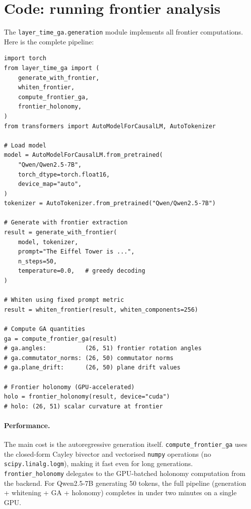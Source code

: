 \documentclass[11pt, twoside, openright]{memoir}
\numberwithin{equation}{chapter}
\begin{document}
\section{Code: running frontier analysis}
\label{sec:frontier-code}

The \texttt{layer\_time\_ga.generation} module implements all
frontier computations.  Here is the complete pipeline:

\begin{lstlisting}[caption={Frontier analysis pipeline}]
import torch
from layer_time_ga import (
    generate_with_frontier,
    whiten_frontier,
    compute_frontier_ga,
    frontier_holonomy,
)
from transformers import AutoModelForCausalLM, AutoTokenizer

# Load model
model = AutoModelForCausalLM.from_pretrained(
    "Qwen/Qwen2.5-7B",
    torch_dtype=torch.float16,
    device_map="auto",
)
tokenizer = AutoTokenizer.from_pretrained("Qwen/Qwen2.5-7B")

# Generate with frontier extraction
result = generate_with_frontier(
    model, tokenizer,
    prompt="The Eiffel Tower is ...",
    n_steps=50,
    temperature=0.0,   # greedy decoding
)

# Whiten using fixed prompt metric
result = whiten_frontier(result, whiten_components=256)

# Compute GA quantities
ga = compute_frontier_ga(result)
# ga.angles:           (26, 51) frontier rotation angles
# ga.commutator_norms: (26, 50) commutator norms
# ga.plane_drift:      (26, 50) plane drift values

# Frontier holonomy (GPU-accelerated)
holo = frontier_holonomy(result, device="cuda")
# holo: (26, 51) scalar curvature at frontier
\end{lstlisting}

\paragraph{Performance.}
The main cost is the autoregressive generation itself.
\texttt{compute\_frontier\_ga} uses the closed-form Cayley
bivector and vectorised \texttt{numpy} operations (no
\texttt{scipy.linalg.logm}), making it fast even for long
generations.  \texttt{frontier\_holonomy} delegates to the
GPU-batched holonomy computation from the backend.
For Qwen2.5-7B generating 50 tokens, the full pipeline
(generation + whitening + GA + holonomy) completes in under
two minutes on a single GPU.
\end{document}
